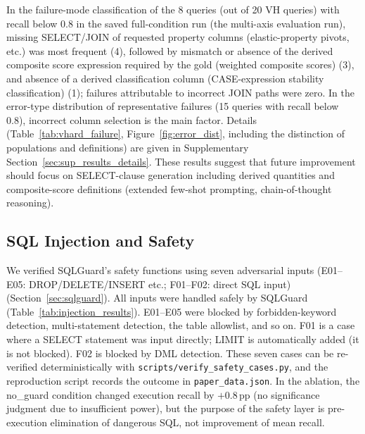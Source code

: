 In the failure-mode classification of the 8 queries (out of 20 VH queries) with recall below 0.8 in the saved full-condition run (the multi-axis evaluation run), missing SELECT/JOIN of requested property columns (elastic-property pivots, etc.) was most frequent (4), followed by mismatch or absence of the derived composite score expression required by the gold (weighted composite scores) (3), and absence of a derived classification column (CASE-expression stability classification) (1); failures attributable to incorrect JOIN paths were zero. In the error-type distribution of representative failures (15 queries with recall below 0.8), incorrect column selection is the main factor. Details (Table~\ref{tab:vhard_failure}, Figure~\ref{fig:error_dist}, including the distinction of populations and definitions) are given in Supplementary Section~\ref{sec:sup_results_details}. These results suggest that future improvement should focus on SELECT-clause generation including derived quantities and composite-score definitions (extended few-shot prompting, chain-of-thought reasoning).


\subsection{SQL Injection and Safety}

\label{sec:injection_safety}

We verified SQLGuard's safety functions using seven adversarial inputs (E01--E05: DROP/DELETE/INSERT etc.; F01--F02: direct SQL input) (Section~\ref{sec:sqlguard}). All inputs were handled safely by SQLGuard (Table~\ref{tab:injection_results}).
E01--E05 were blocked by forbidden-keyword detection, multi-statement detection, the table allowlist, and so on. F01 is a case where a SELECT statement was input directly; LIMIT is automatically added (it is not blocked). F02 is blocked by DML detection. These seven cases can be re-verified deterministically with \texttt{scripts/verify\_safety\_cases.py}, and the reproduction script records the outcome in \texttt{paper\_data.json}. In the ablation, the no\_guard condition changed execution recall by $+$0.8\,pp (no significance judgment due to insufficient power), but the purpose of the safety layer is pre-execution elimination of dangerous SQL, not improvement of mean recall.


